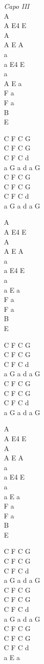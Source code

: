 \begin{chord}
    \textit{Capo III}\\
    A\\
    A E4 E\\
    A\\
    A E A\\
    a\\
    a E4 E\\
    a\\
    A E a\\
    F a\\
    F a\\
    B\\
    E

    C F C G\\
    C F C G\\
    C F C d\\
    a G a d a G\\
    C F C G\\
    C F C G\\
    C F C d\\
    a G a d a G

    A\\
    A E4 E\\
    A\\
    A E A\\
    a\\
    a E4 E\\
    a\\
    a E a\\
    F a\\
    F a\\
    B\\
    E

    C F C G\\
    C F C G\\
    C F C d\\
    a G a d a G\\
    C F C G\\
    C F C G\\
    C F C d\\
    a G a d a G

    A\\
    A E4 E\\
    A\\
    A E A\\
    a\\
    a E4 E\\
    a\\
    a E a\\
    F a\\
    F a\\
    B\\
    E

    C F C G\\
    C F C G\\
    C F C d\\
    a G a d a G\\
    C F C G\\
    C F C G\\
    C F C d\\
    a G a d a G\\
    C F C G\\
    C F C G\\
    C F C d\\
    a E a 
\end{chord}